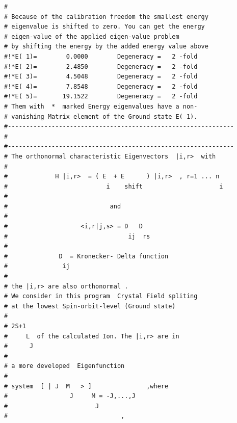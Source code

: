 \begin{enumerate}
{\begin{verbatim}
#                                                              
# Because of the calibration freedom the smallest energy       
# eigenvalue is shifted to zero. You can get the energy        
# eigen-value of the applied eigen-value problem               
# by shifting the energy by the added energy value above       
#!*E( 1)=        0.0000        Degeneracy =   2 -fold            
#!*E( 2)=        2.4850        Degeneracy =   2 -fold            
#!*E( 3)=        4.5048        Degeneracy =   2 -fold            
#!*E( 4)=        7.8548        Degeneracy =   2 -fold            
#!*E( 5)=       19.1522        Degeneracy =   2 -fold            
# Them with  *  marked Energy eigenvalues have a non-          
# vanishing Matrix element of the Ground state E( 1).          
#-------------------------------------------------------------- 
#
#-------------------------------------------------------------- 
# The orthonormal characteristic Eigenvectors  |i,r>  with     
#                                                              
#             H |i,r>  = ( E  + E      ) |i,r>  , r=1 ... n    
#                           i    shift                     i   
#                                                              
#                            and                               
#                                                              
#                    <i,r|j,s> = D   D                         
#                                 ij  rs                       
#                                                              
#              D  = Kronecker- Delta function                  
#               ij                                             
#                                                              
# the |i,r> are also orthonormal .                             
# We consider in this program  Crystal Field spliting          
# at the lowest Spin-orbit-level (Ground state)                
#                                                              
# 2S+1                                                         
#     L  of the calculated Ion. The |i,r> are in               
#      J                                                       
#                                                              
# a more developed  Eigenfunction   			    
#                                                              
# system  [ | J  M   > ]               ,where                  
#                 J     M = -J,...,J                           
#                        J                                     
#                               ,                              

\end{verbatim}}
\end{enumerate}
